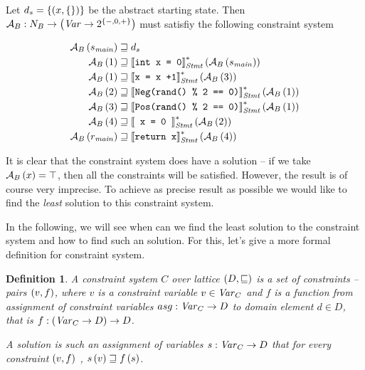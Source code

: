 \documentclass[..thesis.tex]{subfiles}
\newtheorem{defin}{Definition}[section]
\begin{document}
Let $d_s = \left\lbrace \left( x, \left\lbrace \right\rbrace \right) \right\rbrace $ be the abstract starting state.
Then $\mathcal{A}_B : N_B \to \left( \mathit{Var} \to 2^{ \left\lbrace -, 0, + \right\rbrace } \right) $ must satisfiy the following constraint system

\begin{equation*}
  \begin{split}
    \mathcal{A}_B \left( s_{\mathit{main}} \right) & \sqsupseteq d_s \\
    \mathcal{A}_B \left( 1 \right) & \sqsupseteq \left\llbracket \text{\texttt{int x = 0}} \right\rrbracket_{\mathit{Stmt}}^{*} \left( \mathcal{A}_B \left( s_{\mathit{main}} \right) \right) \\
    \mathcal{A}_B \left( 1 \right) & \sqsupseteq \left\llbracket \text{\texttt{x = x +1}}  \right\rrbracket_{\mathit{Stmt}}^{*} \left( \mathcal{A}_B \left( 3 \right) \right) \\
    \mathcal{A}_B \left( 2 \right) & \sqsupseteq \left\llbracket  \text{\texttt{Neg(rand() \% 2 == 0)}}  \right\rrbracket_{\mathit{Stmt}}^{*} \left( \mathcal{A}_B \left( 1 \right) \right) \\
    \mathcal{A}_B \left( 3 \right) & \sqsupseteq \left\llbracket  \text{\texttt{Pos(rand() \% 2 == 0)}}  \right\rrbracket_{\mathit{Stmt}}^{*} \left( \mathcal{A}_B \left( 1 \right) \right) \\
    \mathcal{A}_B \left( 4 \right) & \sqsupseteq \left\llbracket \text{\texttt{ x = 0 }} \right\rrbracket_{\mathit{Stmt}}^{*} \left( \mathcal{A}_B \left( 2 \right) \right) \\
    \mathcal{A}_B \left( r_{\mathit{main}} \right)  & \sqsupseteq \left\llbracket  \text{\texttt{return x}}  \right\rrbracket_{\mathit{Stmt}}^{*} \left( \mathcal{A}_B \left( 4 \right) \right)
  \end{split} 
\end{equation*}


It is clear that the constraint system does have a solution -- if we take $\mathcal{A}_B \left( x \right) = \top$, then all the constraints will be satisfied.
However, the result is of course very imprecise. To achieve as precise result as possible we  would like to find the \textit{least} solution to this constraint system. 

In the following, we will see when can we find the least solution to the constraint system and how to find such an solution. For this, let's give a more formal definition for constraint system.

\begin{defin}
A \textit{constraint system} $C$ over lattice $\left( D, \sqsubseteq \right)$ is a set of \textit{constraints} -- pairs $\left( v, f \right)$,
where $v$ is a constraint variable $v \in \mathit{Var}_C$ and $f$ is a function from assignment of constraint variables $asg: \mathit{Var}_C \to D$ to domain element $d \in D$,
that is $f : \left( \mathit{Var}_C \to D \right) \to D$.

A \textit{solution} is such an assignment of variables $s : \mathit{Var}_C -> D$ that for every constraint $\left( v, f \right)$ , $ s \left( v \right) \sqsupseteq f \left( s \right)$. 
\end{defin}
\end{document}
